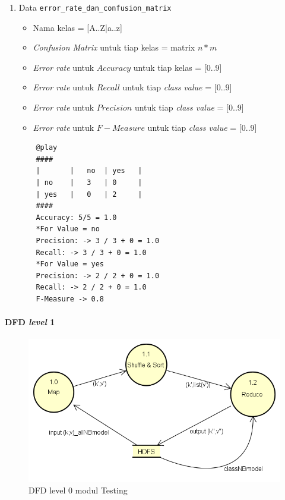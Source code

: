 \begin{enumerate}
	\item{Data \verb|error_rate_dan_confusion_matrix|}
	\begin{itemize}
		\item Nama kelas = [A..Z|a..z]
		\item \textit{Confusion Matrix} untuk tiap kelas = matrix $n*m$
		\item \textit{Error rate} untuk $Accuracy$ untuk tiap kelas = [0..9]
		\item \textit{Error rate} untuk $Recall$ untuk tiap \textit{class value} = [0..9]
		\item \textit{Error rate} untuk $Precision$ untuk tiap \textit{class value} = [0..9]
		\item \textit{Error rate} untuk $F-Measure$ untuk tiap \textit{class value} = [0..9]
	\end{itemize}
	\begin{lstlisting}
	@play
	####
	|		|	no	| yes	|
	| no	|	3	| 0		|
	| yes	|	0	| 2		|
	####
	Accuracy: 5/5 = 1.0
	*For Value = no
	Precision: -> 3 / 3 + 0 = 1.0
	Recall: -> 3 / 3 + 0 = 1.0 
	*For Value = yes
	Precision: -> 2 / 2 + 0 = 1.0
	Recall: -> 2 / 2 + 0 = 1.0
	F-Measure -> 0.8
	\end{lstlisting}
	
\end{enumerate}


\paragraph{DFD \textit{level} 1}
\begin{figure}[H]
	\centering
	\includegraphics[scale=0.65]{Diagram/DFD_1_0_Testing_rdmodel}
	\caption[DFD level 0 modul Testing]{DFD level 0 modul Testing}
	\label{fig:DFD level 0 modul Testing}
\end{figure}

